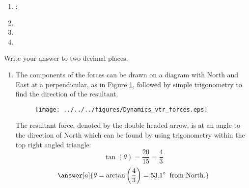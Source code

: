 
\begin{problem}[O1979PIIQ3a]
{
\begin{enumerate}
	\item {}; 
	\item {}
	\item {}  
	\item {}
\end{enumerate}
Write your answer to two decimal places.}
{}
{\begin{enumerate}
	\item The components of the forces can be drawn on a diagram with North and East at a perpendicular, as in Figure \ref{fig:Dynamics_vtr_forces}, followed by simple trigonometry to find the direction of the resultant. 
\begin{figure}[h]
	\centering
	\texttt{[image: ../../../figures/Dynamics\_vtr\_forces.eps]}
	\caption{}
	\label{fig:Dynamics_vtr_forces}
\end{figure}

The resultant force, denoted by the double headed arrow, is at an angle to the direction of North which can be found by using trigonometry within the top right angled triangle:
\begin{equation*}
	\tan(\theta)=\frac{20}{15} = \frac{4}{3} 
\end{equation*}
\begin{equation*}
	\answer[a]{\theta = \arctan\left(\frac{4}{3}\right) = 53.1^{\circ} \:\text{ from North.}}
	\end{equation*}


\end{enumerate}}
\end{problem}
